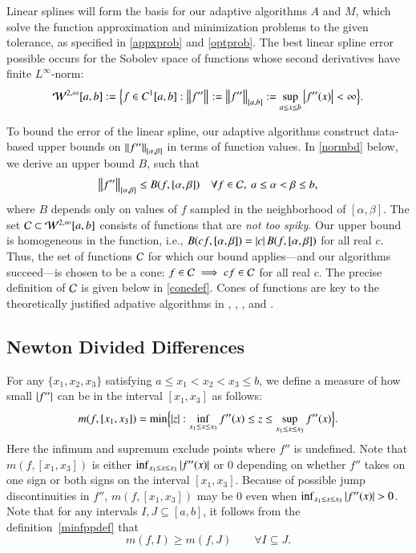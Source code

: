 \documentclass[review]{elsarticle}
\theoremstyle{definition}
\begin{document}
Linear splines will form the basis for our adaptive algorithms $A$ and $M$, which solve the
function approximation and minimization problems to the given tolerance, as
specified in \eqref{appxprob} and \eqref{optprob}. The best linear spline error possible occurs for the Sobolev space of functions whose second derivatives have finite $L^{\infty}$-norm:
\[
\cw^{2,\infty}[a,b] : = \Bigl \{f \in C^1[a,b] : \norm{f''} : = \norm[{[a,b]}]{f''} : = \sup_{a \le x \le b} \abs{f''(x)} <  \infty \Bigr\}.
\]

To bound the error of the linear spline, our adaptive algorithms construct data-based upper bounds on $\norm[{[\alpha,
\beta]}]{f''}$ in terms of function values.  In \eqref{normbd} below, we derive an upper bound $B$, such that
\[
\norm[{[\alpha, \beta]}]{f''} \le B(f,[\alpha,\beta]) \quad \forall f \in \cc, \ a \le \alpha < \beta \le b,
\]
where $B$ depends only on values of $f$ sampled in the neighborhood of $[\alpha,
\beta]$. The set $\cc \subset \cw^{2,\infty}[a,b]$ consists of functions that are \emph{not too spiky}.  Our upper bound is homogeneous in the function, i.e.,
$B(cf,[\alpha,\beta]) = \abs{c} B(f,[\alpha,\beta])$ for all real $c$. Thus, the
set of functions $\cc$ for which our bound applies---and our algorithms
succeed---is chosen to be a cone: $f \in \cc \implies cf \in \cc$ for all real
$c$. The precise definition of $\cc$ is given below in \eqref{conedef}. Cones of
functions are key to the theoretically justified adpative algorithms in
\cite{HicEtal14b}, \cite{Ton14a}, \cite{Din15a}, and \cite{HicRazYun15a}.

\subsection{Newton Divided Differences} \label{sec:ndd}

For any $\{x_1, x_2, x_3\}$ satisfying $a \le x_1 < x_2 < x_3 \le b$, we define a
measure of how small $\abs{f''}$ can be in the interval $[x_1, x_3]$ as follows:
\begin{equation} \label{minfppdef}
m(f,[x_1, x_3]) = \min \Bigl\{ \abs{z}  : \inf_{x_1 \le x \le x_3} f''(x) \le z \le \sup_{x_1 \le x \le x_3} f''(x) \Bigr\}.
\end{equation}
Here the infimum and supremum exclude points where $f''$ is undefined. Note that
$m(f,[x_1, x_3])$ is either $ \inf_{x_1 \le x \le x_3} \abs{f''(x)}$ or $0$
depending on whether $f''$ takes on one sign or both signs on the interval
$[x_1, x_3]$. Because of possible jump discontinuities in $f''$, $m(f,[x_1,
x_3])$ may be $0$ even when $\inf_{x_1 \le x \le x_3} \abs{f''(x)} > 0$. Note
that for any intervals $I , J \subseteq [a,b]$, it follows from the definition~\eqref{minfppdef}
that
\begin{equation} \label{mdec}
m(f,I) \ge m(f,J) \qquad \forall I \subseteq J.
\end{equation}
\end{document}
